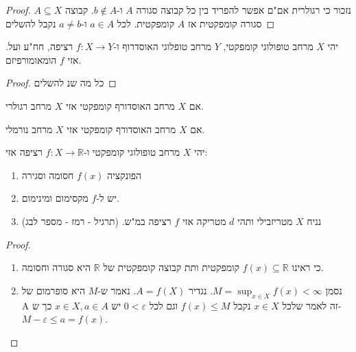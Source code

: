 \documentclass{tstextbook}
\begin{document}
\begin{proof}
נזכור כי רגולרית אם"ם אפשר להפריד בין כל קבוצה סגורה \(A\) ו-\(b \not\in A\). קבוצה \(A\subseteq X\) סגורה קומפקטית אז \(A\) קומפקטית. לכל \(a \in A\) ו-\(a\neq b\) נקבל 
להשלים

\end{proof}
\begin{corollary}
יהי \(X\) מרחב טופולוגי קומפקטי, \(Y\) מרחב טופלוגי האוסדרוף ו-\(f:X\to Y\) רציפה, חח"ע ועל. אזי \(f\) הומאומורפיזם.

\end{corollary}
\begin{proof}
כל מה שנ
להשלים

\end{proof}
\begin{proposition}
אם \(X\) מרחב האוסדורף קומפקטי אזי \(X\) מרחב רגולרי.

\end{proposition}
\begin{proposition}
אם \(X\) מרחב האוסדורף קומפקטי אזי \(X\) מרחב נורמלי.

\end{proposition}
\begin{proposition}
יהי \(X\) מרחב טופולוגי קומפקטי ו-\(f:X\to \mathbb{R}\) רציפה אזי:

  \begin{enumerate}
    \item הפונקציה \(f(x)\) חסומה וסגירה 


    \item יש ל-\(f\) מקסימום ומינימום. 


    \item נניח \(X\) מטריזבילי ותהי \(d\) מטריקה אזי \(f\) רציפה במ"ש. (תרגיל - רמז - מספר לבג) 


  \end{enumerate}
\end{proposition}
\begin{proof}
  \begin{enumerate}
    \item כי ראינו \(f(x)\subseteq \mathbb{R}\) קומפקטית ותת קבוצה קומפקטית של \(\mathbb{R}\) היא סגורה וחסומה. 


    \item נסמן \(M=\sup_{x \in X} f(x)<\infty\). נגדיר \(A=f(X)\). נאמר ש-\(M\) היא סופרמום של A זה לאמר שלכל \(x \in X\) נקבל \(f(x)\leq M\) וגם לכל \(0<\varepsilon\) יש \(x \in X,a \in A\) כך ש-\(M-\varepsilon \leq a=f(x)\). 


  \end{enumerate}
\end{proof}
\end{document}
